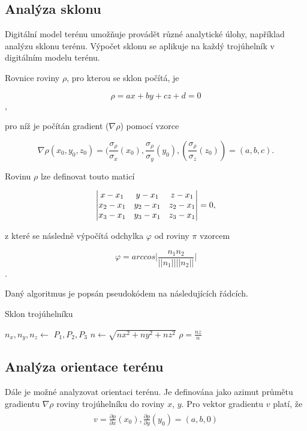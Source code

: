 \documentclass[a4paper,12pt]{article}
\begin{document}
    \subsection{Analýza sklonu}
    Digitální model terénu umožňuje provádět různé analytické úlohy, například analýzu sklonu terénu. Výpočet sklonu se aplikuje na každý trojúhelník v digitálním modelu terénu.

    Rovnice roviny $\rho$, pro kterou se sklon počítá, je

    $$\rho = ax + by + cz + d = 0$$,
    
    pro níž je počítán gradient ($\nabla\rho$) pomocí vzorce
    
    $$\nabla\rho (x_0, y_0, z_0) = (\frac{\sigma_\rho}{\sigma_x}(x_0), \frac{\sigma_\rho}{\sigma_y}(y_0), (\frac{\sigma_\rho}{\sigma_z}(z_0)) = (a, b, c).$$
    
    Rovinu $\rho$ lze definovat touto maticí
    
    \[
      \begin{vmatrix}
        $$x-x_1$$ & $$y-x_1$$ & $$z-x_1$$\\
        $$x_2-x_1$$ & $$y_2-x_1$$ & $$z_2-x_1$$\\
        $$x_3-x_1$$ & $$y_3-x_1$$ & $$z_3-x_1$$ 
      \end{vmatrix}
    =
    0,
    \]
    
    z které se následně výpočítá odchylka $\varphi$ od roviny $\pi$ vzorcem
    
    $$\varphi = arccos \bigg| \frac{n_1 n_2}{||n_1|| ||n_2||} \bigg|$$.

    Daný algoritmus je popsán pseudokódem na následujících řádcích.
    
    \begin{algorithm}
    \caption{Sklon trojúhelníku}
    \begin{algorithmic}[1]
    \State $n_x, n_y, n_z \gets$ {$P_1, P_2, P_3$}
    \State $n \gets \sqrt{nx^2 + ny^2 + nz^2}$
    \State $\rho = {\frac{nz}{n}}$

    \end{algorithmic}
    \end{algorithm}

    \subsection{Analýza orientace terénu}
    Dále je možné analyzovat orientaci terénu. Je definována jako azimut průmětu gradientu $\nabla \rho$ roviny trojúhelníku do roviny $x$, $y$. Pro vektor gradientu $v$ platí, že
    \begin{align*}
        \begin{gathered}
            v = \frac{\partial p}{\partial x}(x_0), \frac{\partial p}{\partial y}(y_0) = (a, b, 0)
        \end{gathered}
    \end{align*}
    
\end{document}
